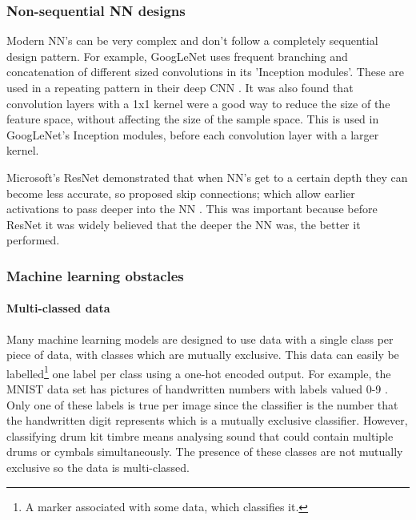\documentclass[12pt]{article}
\begin{document}
	\subsubsection{Non-sequential NN designs}
	\label{sec:nonsequencial-nn-designs}
	
	Modern NN's can be very complex and don't follow a completely sequential design pattern. For example, GoogLeNet uses frequent branching and concatenation of different sized convolutions in its 'Inception modules'. These are used in a repeating pattern in their deep CNN \parencite{Szegedy2015}. It was also found that convolution layers with a 1x1 kernel were a good way to reduce the size of the feature space, without affecting the size of the sample space. This is used in GoogLeNet's Inception modules, before each  convolution layer with a larger kernel.\medskip
	
	Microsoft's ResNet demonstrated that when NN's get to a certain depth they can become less accurate, so proposed skip connections; which allow earlier activations to pass deeper into the NN \parencite{He2015}. This was important because before ResNet it was widely believed that the deeper the NN was, the better it performed.\medskip
	
	\subsubsection{Machine learning obstacles}
	\label{sec:machine_learning_obstacles}
	
	\paragraph{Multi-classed data}
	\label{sec:multiclassed_data}
	
	Many machine learning models are designed to use data with a single class per piece of data, with classes which are mutually exclusive. This data can easily be labelled\footnote{A marker associated with some data, which classifies it.} one label per class using a one-hot encoded output. For example, the MNIST data set has pictures of handwritten numbers with labels valued 0-9 \parencite{MNIST}. Only one of these labels is true per image since the classifier is the number that the handwritten digit represents which is a mutually exclusive classifier. However, classifying drum kit timbre means analysing sound that could contain multiple drums or cymbals simultaneously. The presence of these classes are not mutually exclusive so the data is multi-classed.\medskip
	
\end{document}
